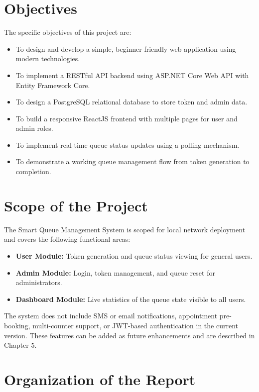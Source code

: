 \section{Objectives}

The specific objectives of this project are:

\begin{itemize}
    \item To design and develop a simple, beginner-friendly web application using modern technologies.
    \item To implement a RESTful API backend using ASP.NET Core Web API with Entity Framework Core.
    \item To design a PostgreSQL relational database to store token and admin data.
    \item To build a responsive ReactJS frontend with multiple pages for user and admin roles.
    \item To implement real-time queue status updates using a polling mechanism.
    \item To demonstrate a working queue management flow from token generation to completion.
\end{itemize}

\section{Scope of the Project}

The Smart Queue Management System is scoped for local network deployment and covers the following functional areas:

\begin{itemize}
    \item \textbf{User Module:} Token generation and queue status viewing for general users.
    \item \textbf{Admin Module:} Login, token management, and queue reset for administrators.
    \item \textbf{Dashboard Module:} Live statistics of the queue state visible to all users.
\end{itemize}

The system does not include SMS or email notifications, appointment pre-booking, multi-counter support, or JWT-based authentication in the current version. These features can be added as future enhancements and are described in Chapter 5.

\section{Organization of the Report}

